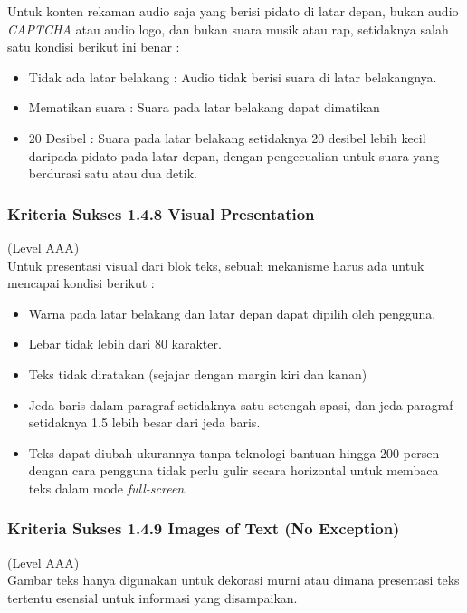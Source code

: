 \documentclass[a4paper,twoside]{article}
\begin{document}
\begin{enumerate}
		Untuk konten rekaman audio saja yang berisi pidato di latar depan, bukan audio \textit{CAPTCHA} atau audio logo, dan bukan suara musik atau rap, setidaknya salah satu kondisi berikut ini benar : 
		
		\begin{itemize}
			\item Tidak ada latar belakang : Audio tidak berisi suara di latar belakangnya.
			\item Mematikan suara : Suara pada latar belakang dapat dimatikan
			\item 20 Desibel : Suara pada latar belakang setidaknya 20 desibel lebih kecil daripada pidato pada latar depan, dengan pengecualian untuk suara yang berdurasi satu atau dua detik.
		\end{itemize}
		
		\subsubsection*{Kriteria Sukses 1.4.8 Visual Presentation}
		\label{subsubsec:kriteria_1.4.8}
		(Level AAA) \\
		
		Untuk presentasi visual dari blok teks, sebuah mekanisme harus ada untuk mencapai kondisi berikut :
		
		\begin{itemize}
			\item Warna pada latar belakang dan latar depan dapat dipilih oleh pengguna.
			\item Lebar tidak lebih dari 80 karakter.
			\item Teks tidak diratakan (sejajar dengan margin kiri dan kanan)
			\item Jeda baris dalam paragraf setidaknya satu setengah spasi, dan jeda paragraf setidaknya 1.5 lebih besar dari jeda baris.
			\item Teks dapat diubah ukurannya tanpa teknologi bantuan hingga 200 persen dengan cara pengguna tidak perlu gulir secara horizontal untuk membaca teks dalam mode \textit{full-screen}.
		\end{itemize}
		
		\subsubsection*{Kriteria Sukses 1.4.9 Images of Text (No Exception)}
		\label{subsubsec:kriteria_1.4.9}
		(Level AAA) \\
		
		Gambar teks hanya digunakan untuk dekorasi murni atau dimana presentasi teks tertentu esensial untuk informasi yang disampaikan. 
		

\end{enumerate}
\end{document}
